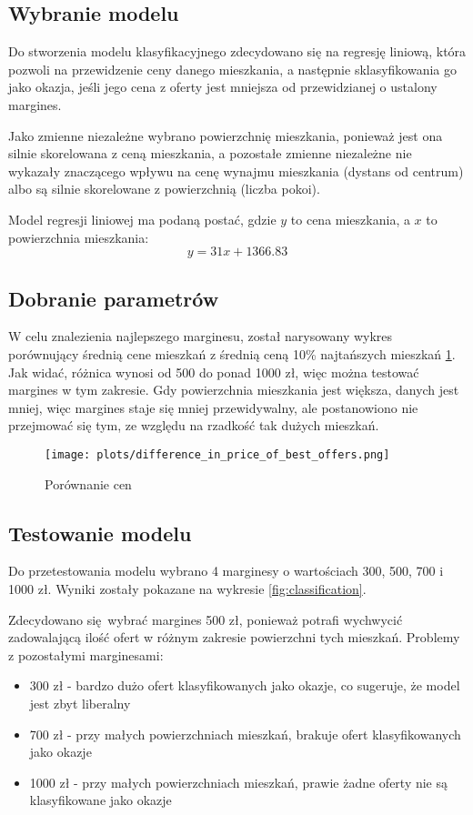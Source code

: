 \documentclass[12pt]{article}
\begin{document}
\subsection{Wybranie modelu}

Do stworzenia modelu klasyfikacyjnego zdecydowano się na regresję liniową, która pozwoli na przewidzenie ceny danego mieszkania, a następnie sklasyfikowania go jako okazja, jeśli jego cena z oferty jest mniejsza od przewidzianej o ustalony margines.

Jako zmienne niezależne wybrano powierzchnię mieszkania, ponieważ jest ona silnie skorelowana z ceną mieszkania, a pozostałe zmienne niezależne nie wykazały znaczącego wpływu na cenę wynajmu mieszkania (dystans od centrum) albo są silnie skorelowane z powierzchnią (liczba pokoi).

Model regresji liniowej ma podaną postać, gdzie $y$ to cena mieszkania, a $x$ to powierzchnia mieszkania:
\begin{equation}
  y = 31x + 1366.83
\end{equation}

\subsection{Dobranie parametrów}
W celu znalezienia najlepszego marginesu, został narysowany wykres porównujący średnią cene mieszkań z średnią ceną 10\% najtańszych mieszkań \ref{fig:margin_analysis}. Jak widać, różnica wynosi od 500 do ponad 1000 zł, więc można testować margines w tym zakresie. Gdy powierzchnia mieszkania jest większa, danych jest mniej, więc margines staje się mniej przewidywalny, ale postanowiono nie przejmować się tym, ze względu na rzadkość tak dużych mieszkań.

\begin{figure}[h!]
  \centering
  \texttt{[image: plots/difference\_in\_price\_of\_best\_offers.png]}
  \caption{Porównanie cen}
  \label{fig:margin_analysis}
\end{figure}

\subsection{Testowanie modelu}
Do przetestowania modelu wybrano 4 marginesy o wartościach 300, 500, 700 i 1000 zł. Wyniki zostały pokazane na wykresie \ref{fig:classification}. 

Zdecydowano się wybrać margines 500 zł, ponieważ potrafi wychwycić zadowalającą ilość ofert w różnym zakresie powierzchni tych mieszkań. Problemy z pozostałymi marginesami:
\begin{itemize}
  \item 300 zł - bardzo dużo ofert klasyfikowanych jako okazje, co sugeruje, że model jest zbyt liberalny
  \item 700 zł - przy małych powierzchniach mieszkań, brakuje ofert klasyfikowanych jako okazje
  \item 1000 zł - przy małych powierzchniach mieszkań, prawie żadne oferty nie są klasyfikowane jako okazje
\end{itemize}
\end{document}
